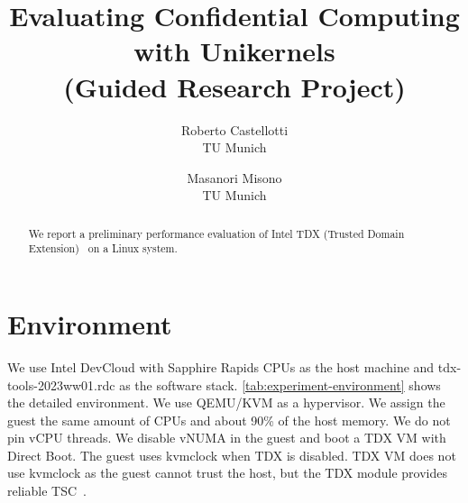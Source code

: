 \documentclass[letterpaper,twocolumn,10pt]{article}
\newcommand{\titlename}{
Evaluating Confidential Computing with Unikernels \\ (Guided Research Project)
}
\begin{document}
\date{}

\title{\Large \bf \titlename}

\author{
{\rm Roberto Castellotti}\\
TU Munich
\and
{\rm Masanori Misono}\\
TU Munich
\and
} %

\maketitle

\begin{abstract}
We report a preliminary performance evaluation of Intel TDX (Trusted Domain Extension)~\cite{tdx} on a Linux system.
\end{abstract}

\section{Environment}

We use Intel DevCloud with Sapphire Rapids CPUs as the host machine and tdx-tools-2023ww01.rdc as the software stack.
\autoref{tab:experiment-environment} shows the detailed environment.
We use QEMU/KVM as a hypervisor.
We assign the guest the same amount of CPUs and about 90\% of the host memory.
We do not pin vCPU threads.
We disable vNUMA in the guest and boot a TDX VM with Direct Boot.
The guest uses kvmclock when TDX is disabled.
TDX VM does not use kvmclock as the guest cannot trust the host, but the TDX module provides reliable TSC~\cite{tdx_secure_spec}.
\end{document}
